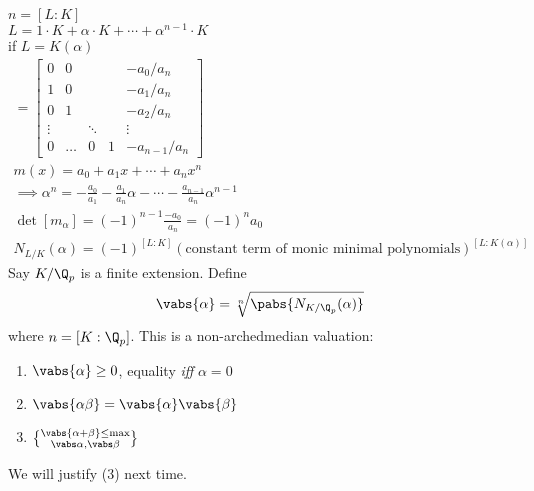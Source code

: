 $n=[L:K]$ \\
$L=1\cdot K+\alpha\cdot K+\dotsb+\alpha^{n-1}\cdot K$ \\
if $L=K(\alpha)$ %
\begin{gather*}
[m_\alpha] = \begin{bmatrix}
0 & 0 & & & -a_0/a_n \\
1 & 0 & & & -a_1/a_n \\
0 & 1 & & & -a_2/a_n \\
\vdots & & \ddots & & \vdots \\
0 & \hdots & 0 & 1 & -a_{n-1}/a_n
\end{bmatrix} \\
m(x) = a_0 + a_1x + \dotsb + a_nx^n \\
\implies \alpha^n = -\frac{a_0}{a_1}-\frac{a_1}{a_n}\alpha-\dotsb-\frac{a_{n-1}}{a_n}\alpha^{n-1} \\
\det[m_\alpha] = (-1)^{n-1}\frac{-a_0}{a_n} = (-1)^n a_0 \\
N_{L/K}(\alpha) = (-1)^{[L:K]}(\text{constant term of monic minimal polynomials})^{[L:K(\alpha)]}
\end{gather*}
Say $K/\Q_p$ is a finite extension.  Define
\[ \vabs{\alpha}=\sqrt[n]{\pabs{N_{K/\Q_p}(\alpha)}} \]
where $n=[K:\Q_p]$.  This is a non-archedmedian valuation:
\begin{enumerate}[label=(\arabic*)]
\item $\vabs{\alpha}\geq0$, equality \emph{iff} $\alpha=0$ \checkmark
\item $\vabs{\alpha\beta}=\vabs{\alpha}\vabs{\beta}$ \checkmark
\item $\vabs{\alpha+\beta}\leq\max\brace{\vabs\alpha,\vabs\beta}$
\end{enumerate}
We will justify (3) next time.

